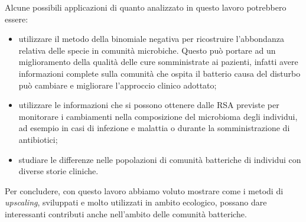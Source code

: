 Alcune possibili applicazioni di quanto analizzato in questo lavoro potrebbero essere:

\begin{itemize}

    \item utilizzare il metodo della binomiale negativa per ricostruire l'abbondanza relativa delle specie in comunità microbiche. Questo può portare ad un miglioramento della qualità delle cure somministrate ai pazienti, infatti avere informazioni complete sulla comunità che ospita il batterio causa del disturbo può cambiare e migliorare l'approccio clinico adottato;
    
    \item utilizzare le informazioni che si possono ottenere dalle RSA previste per monitorare i cambiamenti nella composizione del microbioma degli individui, ad esempio in casi di infezione e malattia o durante la somministrazione di antibiotici;
    
    \item studiare le differenze nelle popolazioni di comunità batteriche di individui con diverse storie cliniche.
    

\end{itemize}


Per concludere, con questo lavoro abbiamo voluto mostrare come i metodi di \emph{upscaling}, sviluppati e molto utilizzati in ambito ecologico, possano dare interessanti contributi anche nell'ambito delle comunità batteriche. 